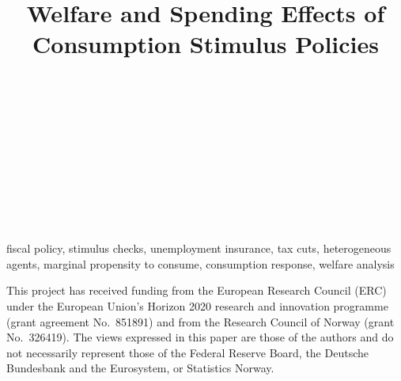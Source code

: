 \documentclass[qe]{econsocart}
\begin{document}
\begin{frontmatter}

  \title{Welfare and Spending Effects of Consumption Stimulus Policies}

  \begin{aug}
    \author[add1]{~}
    \author[add2]{~}
    \author[add3]{~}
    \author[add4]{~}
    \author[add5]{~}

    \address[add1]{%
      ,
      }

    \address[add2]{%
      }

    \address[add3]{%
      ,
      }

    \address[add4]{%
      }

    \address[add5]{%
      ,
      }
  \end{aug}

  \begin{abstract}
    
  \end{abstract}

  \begin{keyword}
    fiscal policy, stimulus checks, unemployment insurance, tax cuts, heterogeneous agents, marginal propensity to consume, consumption response, welfare analysis
  \end{keyword}

  \begin{keyword}[class=JEL]
  \end{keyword}

  \begin{funding}
    This project has received funding from the European Research Council (ERC) under the European Union's Horizon 2020 research and innovation programme (grant agreement No.\ 851891) and from the Research Council of Norway (grant No.\ 326419). The views expressed in this paper are those of the authors and do not necessarily represent those of the Federal Reserve Board, the Deutsche Bundesbank and the Eurosystem, or Statistics Norway.
  \end{funding}

\end{frontmatter}
\end{document}
